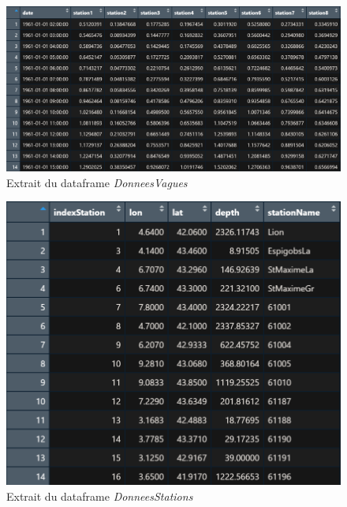 \documentclass[a4paper,french,10pt]{article}
\begin{document}
\begin{figure}[htp] 
	\centering
	\includegraphics[scale=0.45]{images/data1.png}
	\caption{Extrait du dataframe \textit{DonneesVagues}}
	\label{data1}
\end{figure}

\begin{figure}[htp] 
	\centering
	\includegraphics[scale=0.45]{images/data2.png}
	\caption{Extrait du dataframe \textit{DonneesStations}}
	\label{data2}
\end{figure}
\end{document}

